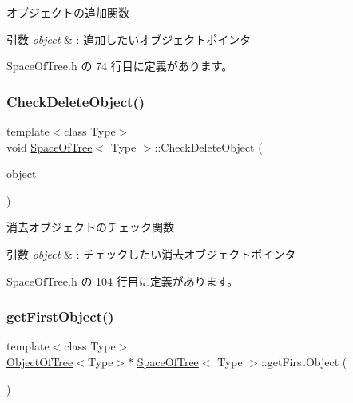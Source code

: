 オブジェクトの追加関数 


\begin{DoxyParams}{引数}
{\em object} & \+: 追加したいオブジェクトポインタ \\
\hline
\end{DoxyParams}


 Space\+Of\+Tree.\+h の 74 行目に定義があります。

\mbox{\label{class_space_of_tree_a746aef6b3bafdde17daa5125cc9bc43c}} 
\subsubsection{\texorpdfstring{Check\+Delete\+Object()}{CheckDeleteObject()}}
{\footnotesize\ttfamily template$<$class Type$>$ \\
void \mbox{\hyperlink{class_space_of_tree}{Space\+Of\+Tree}}$<$ Type $>$\+::Check\+Delete\+Object (\begin{DoxyParamCaption}\item[{\mbox{\hyperlink{class_object_of_tree}{Object\+Of\+Tree}}$<$ Type $>$ $\ast$}]{object }\end{DoxyParamCaption})\hspace{0.3cm}{\ttfamily [inline]}}



消去オブジェクトのチェック関数 


\begin{DoxyParams}{引数}
{\em object} & \+: チェックしたい消去オブジェクトポインタ \\
\hline
\end{DoxyParams}


 Space\+Of\+Tree.\+h の 104 行目に定義があります。

\mbox{\label{class_space_of_tree_a97ee8bf10b8d88d49e61875c88608b15}} 
\subsubsection{\texorpdfstring{get\+First\+Object()}{getFirstObject()}}
{\footnotesize\ttfamily template$<$class Type$>$ \\
\mbox{\hyperlink{class_object_of_tree}{Object\+Of\+Tree}}$<$Type$>$$\ast$ \mbox{\hyperlink{class_space_of_tree}{Space\+Of\+Tree}}$<$ Type $>$\+::get\+First\+Object (\begin{DoxyParamCaption}{ }\end{DoxyParamCaption})\hspace{0.3cm}{\ttfamily [inline]}}



